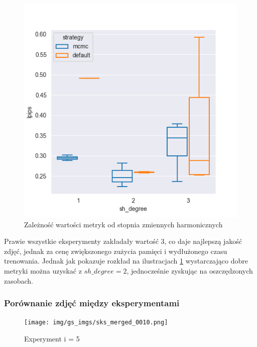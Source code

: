 \begin{figure}[h!]
\begin{minipage}{0.3\textwidth}
    \end{minipage}
    \hfill
    \begin{minipage}{0.3\textwidth}
        \centering
        \includegraphics[width=\textwidth]{img/gs_metrics/lpips_sh_degree.png}
    \end{minipage}
    \caption{Zależność wartości metryk od stopnia zmiennych harmonicznych}
    \label{fig:sh_deg_gs_metrics}
\end{figure}

Prawie wszystkie eksperymenty zakładały wartość 3, co daje najlepszą jakość zdjęć, jednak za cenę zwiększonego zużycia pamięci i wydłużonego czasu trenowania. Jednak jak pokazuje rozkład na ilustracjach \ref{fig:sh_deg_gs_metrics} wystarczająco dobre metryki można uzyskać z $sh\_degree = 2$, jednocześnie zyskując na oszczędzonych zasobach. 

\pagebreak

\subsubsection{Porównanie zdjęć między eksperymentami}

\begin{figure}[!h]
    \centering
    \texttt{[image: img/gs\_imgs/sks\_merged\_0010.png]}
    \caption{Experyment i = 5}\label{fig:eval_1}
\end{figure}

